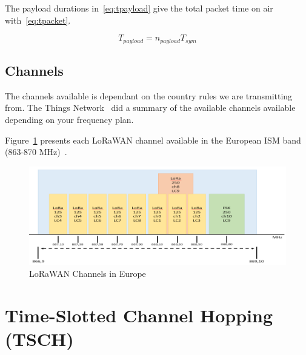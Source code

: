 The payload durations in~\ref{eq:tpayload} give the total packet time on air
with~\ref{eq:tpacket}.

\begin{equation}
  \label{eq:tpayload}
  T_{payload} = n_{payload} T_{sym}
\end{equation}


\subsection{Channels}

The channels available is dependant on the country rules we are transmitting from.
The Things Network~\cite{ttnfrequencyplans} did a summary of the available
channels available depending on your frequency plan.

Figure~\ref{fig:channels} presents each LoRaWAN channel available in the
European ISM band (863-870 MHz)~\cite{Polonelli_2019}.

\begin{figure}[H]
  \centering
  \includegraphics[width=\textwidth]{thesis.tex/chapters/context/fig/channels.png}
  \caption{LoRaWAN Channels in Europe\cite{Polonelli_2019}\label{fig:channels}}
\end{figure}




\section{Time-Slotted Channel Hopping (TSCH)}


